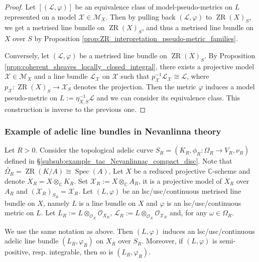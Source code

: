 \documentclass [11pt,reqno]{amsart}
\def\bC{{\mathbb{C}}}
\newcommand{\1}{\mathmybb{1}}
\def\cL{{\mathcal{L}}}
\def\cM{{\mathcal{M}}}
\def\cO{{\mathcal{O}}}
\def\cX{{\mathcal{X}}}
\def\Spec{\operatorname{Spec}}
\def\ZR{\operatorname{ZR}}
\def\tilde{\widetilde}
\begin{document}
\begin{proof}
Let $[(\cL,\varphi)]$ be an equivalence class of model-pseudo-metrics on $L$ represented on a model $\cX\in\cM_{X}$. Then by pulling back $(\cL,\varphi)$ to $\ZR(X)_{S}$, we get a metrised line bundle on $\ZR(X)_{S}$, and thus a metrised line bundle on $X$ over $S$ by Proposition \ref{prop:ZR_interpretation_pseudo-metric_families}.

Conversely, let $(\cL,\varphi)$ be a metrised line bundle on $\ZR(X)_{S}$. By Proposition \ref{prop:coherent_sheaves_locally_closed_integral}, there exists a projective model $\cX\in\cM_{X}$ and a line bundle $\cL_{\cX}$ on $\cX$ such that $p_{\cX}^{-1}\cL_{\cX}\cong \cL$, where $p_{\cX}:\ZR(X)_{S}\to \cX_{S}$ denotes the projection. Then the metric $\varphi$ induces a model pseudo-metric on $L:=\eta_{X,S}^{-1}\cL$ and we can consider its equivalence class. This construction is inverse to the previous one. 
\end{proof}

\subsubsection{Example of adelic line bundles in Nevanlinna theory}
\label{subsub:adelic_line_bundle_Nevanlinna}

Let $R>0$. Consider the topological adelic curve $S_{R}=(K_{R},\phi_{R} : \Omega_{R} \to V_{R},\nu_{R})$ defined in \S \ref{subsub:example_tac_Nevanlinnaç_compact_disc}. Note that $\tilde{\Omega_{R}}=\ZR(K/A)\cong\Spec(A)$. Let $X$ be a reduced projective $\bC$-scheme and denote $X_{R}=X \otimes_{\bC} K_{R}$. Set $\cX_{R}:=X \otimes_{\bC} A_{R}$, it is a projective model of $X_{R}$ over $A_{R}$ and $(\cX_{R})_{S_{R}}=\cX_{R}$. Let $(L,\varphi)$ be an lsc/usc/continuous metrised line bundle on $X$, namely $L$ is a line bundle on $X$ and $\varphi$ is an lsc/usc/continuous metric on $L$. Let $L_{R} := L \otimes_{\cO_X} \cO_{X_{R}}$, $\cL_{R}:=L\otimes_{\cO_{X}}\cO_{\cX_{R}}$ and, for any $\omega\in\Omega_{R}$. %

\begin{proposition}
\label{prop:adelic_line_bundle_Nevanlinna}
We use the same notation as above. Then $(L,\varphi)$ induces an lsc/usc/continuous adelic line bundle $(L_{R},\varphi_{R})$ on $X_{R}$ over $S_{R}$. Moreover, if $(L,\varphi)$ is semi-positive, resp. integrable, then so is $(L_{R},\varphi_{R})$.
\end{proposition}
\end{document}

